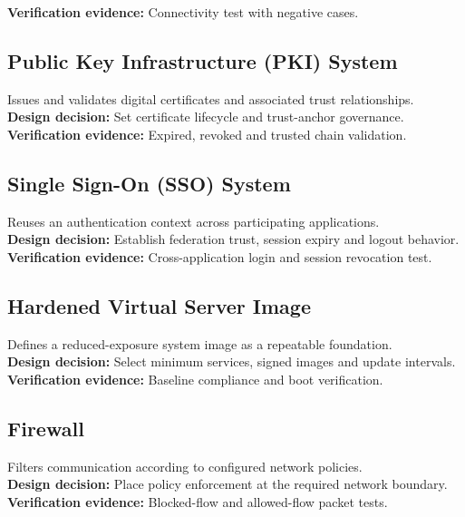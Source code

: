 \documentclass[10pt,letterpaper]{article}
\begin{document}
\textbf{Verification evidence:} Connectivity test with negative cases.\\[3pt]
\subsection{Public Key Infrastructure (PKI) System}
Issues and validates digital certificates and associated trust relationships.\\[4pt]
\textbf{Design decision:} Set certificate lifecycle and trust-anchor governance.\\[3pt]
\textbf{Verification evidence:} Expired, revoked and trusted chain validation.\\[3pt]
\subsection{Single Sign-On (SSO) System}
Reuses an authentication context across participating applications.\\[4pt]
\textbf{Design decision:} Establish federation trust, session expiry and logout behavior.\\[3pt]
\textbf{Verification evidence:} Cross-application login and session revocation test.\\[3pt]
\subsection{Hardened Virtual Server Image}
Defines a reduced-exposure system image as a repeatable foundation.\\[4pt]
\textbf{Design decision:} Select minimum services, signed images and update intervals.\\[3pt]
\textbf{Verification evidence:} Baseline compliance and boot verification.\\[3pt]
\subsection{Firewall}
Filters communication according to configured network policies.\\[4pt]
\textbf{Design decision:} Place policy enforcement at the required network boundary.\\[3pt]
\textbf{Verification evidence:} Blocked-flow and allowed-flow packet tests.\\[3pt]
\end{document}
